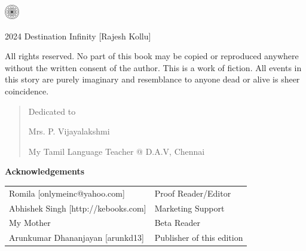 \begin{center}
\HUGE{\thetitle}
\end{center}
\cleardoublepage

\begin{center}
\HUGE{\thetitle}
\end{center}

\begin{center}
\LARGE\textsf{\theauthor}
\end{center}

\vfill

\begin{center}
    \includegraphics[width=18pt]{logo.pdf}
\end{center}
\clearpage

\begingroup
\footnotesize
\setlength{\parindent}{0pt}
\setlength{\parskip}{\baselineskip}

\textcopyright{} 2024 Destination Infinity [Rajesh Kollu]

All rights reserved. No part of this book may be copied or reproduced anywhere
without the written consent of the author. This is a work of fiction. All events
in this story are purely imaginary and resemblance to anyone dead or alive is sheer
coincidence.

\endgroup
\clearpage

\begin{quote}
\begin{center}Dedicated to

\LARGE
Mrs. P. Vijayalakshmi
\normalsize

My Tamil Language Teacher @ D.A.V, Chennai
\end{center}
\end{quote}

\vfill

\textbf{Acknowledgements}

\footnotesize
\begin{tabular}{l l}
Romila [onlymeinc@yahoo.com] & Proof Reader/Editor \\
Abhishek Singh [http://kebooks.com] & Marketing Support \\
My Mother & Beta Reader \\
Arunkumar Dhananjayan [arunkd13] & Publisher of this edition
\end{tabular}


\clearpage